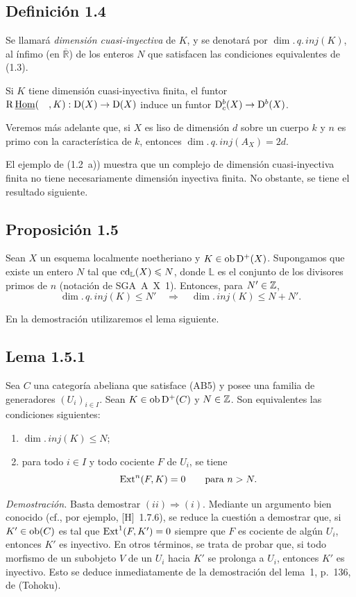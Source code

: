 \subsection*{Definición 1.4}
Se llamará \emph{dimensión cuasi-inyectiva} de $K$, y se denotará por $\dim.\,q.\,inj(K)$, al ínfimo (en $\overline{\mathbb R}$) de los enteros $N$ que satisfacen las condiciones equivalentes de (1.3).

Si $K$ tiene dimensión cuasi-inyectiva finita, el funtor $\mathrm{R}\,\underline{\operatorname{Hom}}(\quad,K) : \mathrm{D}(X) \to \mathrm{D}(X)$ induce un funtor $\mathrm{D}_c^{b}(X) \to \mathrm{D}^{b}(X)$.

Veremos más adelante que, si $X$ es liso de dimensión $d$ sobre un cuerpo $k$ y $n$ es primo con la característica de $k$, entonces $\dim.\,q.\,inj(A_X) = 2d$.

El ejemplo de (1.2~a)) muestra que un complejo de dimensión cuasi-inyectiva finita no tiene necesariamente dimensión inyectiva finita. No obstante, se tiene el resultado siguiente.

\subsection*{Proposición 1.5}
Sean $X$ un esquema localmente noetheriano y $K \in \operatorname{ob} \mathrm{D}^{+}(X)$. Supongamos que existe un entero $N$ tal que $\operatorname{cd}_{\mathbb{L}}(X) \leqslant N$, donde $\mathbb{L}$ es el conjunto de los divisores primos de $n$ (notación de SGA~A~X~1). Entonces, para $N' \in \mathbb{Z}$,
\[
\dim.\,q.\,inj(K) \leqslant N' \quad \Longrightarrow \quad \dim.\,inj(K) \leqslant N + N'.
\]

En la demostración utilizaremos el lema siguiente.

\subsection*{Lema 1.5.1}
Sea $C$ una categoría abeliana que satisface (AB5) y posee una familia de generadores $(U_i)_{i \in I}$. Sean $K \in \operatorname{ob} \mathrm{D}^{+}(C)$ y $N \in \mathbb{Z}$. Son equivalentes las condiciones siguientes:
\begin{enumerate}[label=(\roman*)]
\item $\dim.\,inj(K) \leqslant N$;
\item para todo $i \in I$ y todo cociente $F$ de $U_i$, se tiene
\[
\operatorname{Ext}^n(F,K) = 0 \qquad \text{para } n > N.
\]
\end{enumerate}

\emph{Demostración.} Basta demostrar $(ii) \Rightarrow (i)$. Mediante un argumento bien conocido (cf., por ejemplo, [H]~1.7.6), se reduce la cuestión a demostrar que, si $K' \in \operatorname{ob}(C)$ es tal que $\operatorname{Ext}^1(F,K') = 0$ siempre que $F$ es cociente de algún $U_i$, entonces $K'$ es inyectivo. En otros términos, se trata de probar que, si todo morfismo de un subobjeto $V$ de un $U_i$ hacia $K'$ se prolonga a $U_i$, entonces $K'$ es inyectivo. Esto se deduce inmediatamente de la demostración del lema~1, p.~136, de (Tohoku).

